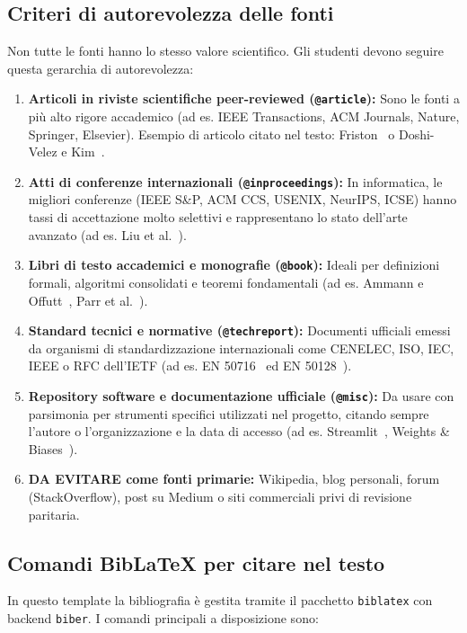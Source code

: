\subsection{Criteri di autorevolezza delle fonti}
Non tutte le fonti hanno lo stesso valore scientifico. Gli studenti devono seguire questa gerarchia di autorevolezza:
\begin{enumerate}
    \item \textbf{Articoli in riviste scientifiche peer-reviewed (\texttt{@article}):} Sono le fonti a più alto rigore accademico (ad es. IEEE Transactions, ACM Journals, Nature, Springer, Elsevier). Esempio di articolo citato nel testo: Friston~\cite{friston2010free} o Doshi-Velez e Kim~\cite{doshi2017towards}.
    \item \textbf{Atti di conferenze internazionali (\texttt{@inproceedings}):} In informatica, le migliori conferenze (IEEE S\&P, ACM CCS, USENIX, NeurIPS, ICSE) hanno tassi di accettazione molto selettivi e rappresentano lo stato dell'arte avanzato (ad es. Liu et al.~\cite{liu2009false}).
    \item \textbf{Libri di testo accademici e monografie (\texttt{@book}):} Ideali per definizioni formali, algoritmi consolidati e teoremi fondamentali (ad es. Ammann e Offutt~\cite{ammann2016introduction}, Parr et al.~\cite{parr2022active}).
    \item \textbf{Standard tecnici e normative (\texttt{@techreport}):} Documenti ufficiali emessi da organismi di standardizzazione internazionali come CENELEC, ISO, IEC, IEEE o RFC dell'IETF (ad es. EN 50716~\cite{en50716} ed EN 50128~\cite{en50128}).
    \item \textbf{Repository software e documentazione ufficiale (\texttt{@misc}):} Da usare con parsimonia per strumenti specifici utilizzati nel progetto, citando sempre l'autore o l'organizzazione e la data di accesso (ad es. Streamlit~\cite{streamlit2019}, Weights \& Biases~\cite{wandb2020}).
    \item \textbf{DA EVITARE come fonti primarie:} Wikipedia, blog personali, forum (StackOverflow), post su Medium o siti commerciali privi di revisione paritaria.
\end{enumerate}

\subsection{Comandi BibLaTeX per citare nel testo}
In questo template la bibliografia è gestita tramite il pacchetto \texttt{biblatex} con backend \texttt{biber}. I comandi principali a disposizione sono:

